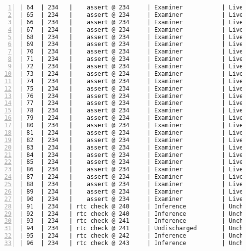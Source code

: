 \begin{lstlisting}[gobble=0, numbers=left, caption={POGS report for PCA Pump prototype}, label={listing:pca_ravenscar:pogs_full}]
| 64  | 234   |    assert @ 234     | Examiner           | Live      |   EL   |
| 65  | 234   |    assert @ 234     | Examiner           | Live      |   EL   |
| 66  | 234   |    assert @ 234     | Examiner           | Live      |   EL   |
| 67  | 234   |    assert @ 234     | Examiner           | Live      |   EL   |
| 68  | 234   |    assert @ 234     | Examiner           | Live      |   EL   |
| 69  | 234   |    assert @ 234     | Examiner           | Live      |   EL   |
| 70  | 234   |    assert @ 234     | Examiner           | Live      |   EL   |
| 71  | 234   |    assert @ 234     | Examiner           | Live      |   EL   |
| 72  | 234   |    assert @ 234     | Examiner           | Live      |   EL   |
| 73  | 234   |    assert @ 234     | Examiner           | Live      |   EL   |
| 74  | 234   |    assert @ 234     | Examiner           | Live      |   EL   |
| 75  | 234   |    assert @ 234     | Examiner           | Live      |   EL   |
| 76  | 234   |    assert @ 234     | Examiner           | Live      |   EL   |
| 77  | 234   |    assert @ 234     | Examiner           | Live      |   EL   |
| 78  | 234   |    assert @ 234     | Examiner           | Live      |   EL   |
| 79  | 234   |    assert @ 234     | Examiner           | Live      |   EL   |
| 80  | 234   |    assert @ 234     | Examiner           | Live      |   EL   |
| 81  | 234   |    assert @ 234     | Examiner           | Live      |   EL   |
| 82  | 234   |    assert @ 234     | Examiner           | Live      |   EL   |
| 83  | 234   |    assert @ 234     | Examiner           | Live      |   EL   |
| 84  | 234   |    assert @ 234     | Examiner           | Live      |   EL   |
| 85  | 234   |    assert @ 234     | Examiner           | Live      |   EL   |
| 86  | 234   |    assert @ 234     | Examiner           | Live      |   EL   |
| 87  | 234   |    assert @ 234     | Examiner           | Live      |   EL   |
| 88  | 234   |    assert @ 234     | Examiner           | Live      |   EL   |
| 89  | 234   |    assert @ 234     | Examiner           | Live      |   EL   |
| 90  | 234   |    assert @ 234     | Examiner           | Live      |   EL   |
| 91  | 234   | rtc check @ 240     | Inference          | Unchecked |   IU   |
| 92  | 234   | rtc check @ 240     | Inference          | Unchecked |   IU   |
| 93  | 234   | rtc check @ 241     | Inference          | Unchecked |   IU   |
| 94  | 234   | rtc check @ 241     | Undischarged       | Unchecked |   UU   |
| 95  | 234   | rtc check @ 242     | Inference          | Unchecked |   IU   |
| 96  | 234   | rtc check @ 243     | Inference          | Unchecked |   IU   |

\end{lstlisting}

